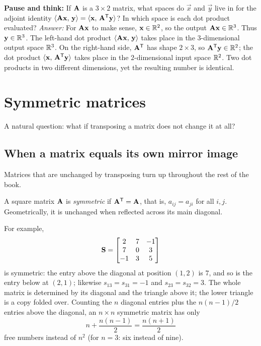 \begin{recoverybox}
\textbf{Pause and think:} If $\mathbf{A}$ is a $3\times 2$ matrix, what spaces do $\vec{x}$ and $\vec{y}$
live in for the adjoint identity $\langle \mathbf{A}\mathbf{x},\, \mathbf{y} \rangle = \langle \mathbf{x},\, \mathbf{A}^{\mathsf{T}}\mathbf{y} \rangle$?
In which space is each dot product evaluated?
\emph{Answer:} For $\mathbf{A}\mathbf{x}$ to make sense, $\mathbf{x}\in\mathbb{R}^2$, so the output $\mathbf{A}\mathbf{x}\in\mathbb{R}^3$.
Thus $\mathbf{y}\in\mathbb{R}^3$. The left-hand dot product $\langle \mathbf{A}\mathbf{x},\, \mathbf{y} \rangle$ takes place in the
$3$-dimensional output space $\mathbb{R}^3$. On the right-hand side, $\mathbf{A}^{\mathsf{T}}$ has shape $2\times 3$, so
$\mathbf{A}^{\mathsf{T}}\mathbf{y}\in\mathbb{R}^2$; the dot product $\langle \mathbf{x},\, \mathbf{A}^{\mathsf{T}}\mathbf{y} \rangle$ takes place in the
$2$-dimensional input space $\mathbb{R}^2$. Two dot products in two different dimensions, yet the resulting
number is identical.
\end{recoverybox}

\section{Symmetric matrices}

A natural question: what if transposing a matrix does not change it at all?

\subsection{When a matrix equals its own mirror image}

Matrices that are unchanged by transposing turn up throughout the rest of the book.

\begin{definition}\label{ch10:def-symmetric}
A square matrix $\mathbf{A}$ is \emph{symmetric} if $\mathbf{A}^{\mathsf{T}}=\mathbf{A}$, that is, $a_{ij}=a_{ji}$ for all
$i,j$. Geometrically, it is unchanged when reflected across its main diagonal.
\end{definition}

For example,
\[
  \mathbf{S}=\begin{bmatrix} 2 & 7 & -1 \\ 7 & 0 & 3 \\ -1 & 3 & 5 \end{bmatrix}
\]
is symmetric: the entry above the diagonal at position $(1,2)$ is $7$, and so is the entry below at
$(2,1)$; likewise $s_{13}=s_{31}=-1$ and $s_{23}=s_{32}=3$. The whole matrix is determined by its
diagonal and the triangle above it; the lower triangle is a copy folded over. Counting the $n$
diagonal entries plus the $n(n-1)/2$ entries above the diagonal, an $n\times n$ symmetric matrix
has only
\[
  n + \frac{n(n-1)}{2} = \frac{n(n+1)}{2}
\]
free numbers instead of $n^2$ (for $n=3$: six instead of nine).

